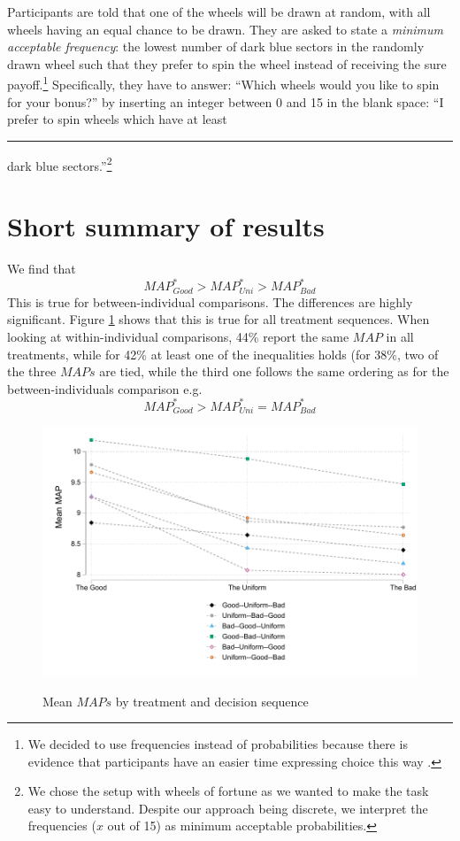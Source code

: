 \documentclass[12pt, a4paper]{article}
\begin{document}
Participants are told that one of the wheels will be drawn at random, with all wheels having an equal chance to be drawn.
They are asked to state a \textit{minimum acceptable frequency}: the lowest number of dark blue sectors in the randomly drawn wheel such that they prefer to spin the wheel instead of receiving the sure payoff.\footnote{
We decided to use frequencies instead of probabilities because there is evidence that participants have an easier time expressing choice this way \citep{Quercia2016}.}
Specifically, they have to answer: ``Which wheels would you like to spin for your bonus?'' by inserting an integer between 0 and 15 in the blank space: ``I prefer to spin wheels which have at least \rule{1cm}{0.15mm} dark blue sectors.''\footnote{
We chose the setup with wheels of fortune as we wanted to make the task easy to understand.
Despite our approach being discrete, we interpret the frequencies ($x$ out of 15) as minimum acceptable probabilities.
}


\section{Short summary of results}

We find that $$MAP^*_{Good} > MAP^*_{Uni} > MAP^*_{Bad}$$
This is true for between-individual comparisons.
The differences are highly significant.
Figure \ref{fig:MeanMAPs} shows that this is true for all treatment sequences.
When looking at within-individual comparisons, 44\% report the same $MAP$ in all treatments, while for 42\% at least one of the inequalities holds (for 38\%, two of the three $MAPs$ are tied, while the third one follows the same ordering as for the between-individuals comparison e.g. $$MAP^*_{Good} > MAP^*_{Uni} = MAP^*_{Bad}$$

\begin{figure}[h!]
	\centering
	{\includegraphics[width=\linewidth]{Fig2_MeanMAPs_nice.pdf}}
	\caption{Mean $MAPs$ by treatment and decision sequence}
	\label{fig:MeanMAPs}
\end{figure}
\end{document}
